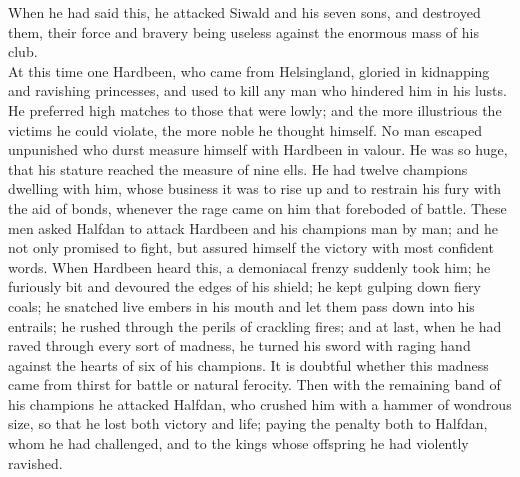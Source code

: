 \documentclass[10pt,a4paper]{report}
\begin{document}
When he had said this, he attacked Siwald and his seven sons, and destroyed them, their force and bravery being useless against the enormous mass of his club.\\

At this time one Hardbeen, who came from Helsingland, gloried in kidnapping and ravishing princesses, and used to kill any man who hindered him in his lusts. He preferred high matches to those that were lowly; and the more illustrious the victims he could violate, the more noble he thought himself. No man escaped unpunished who durst measure himself with Hardbeen in valour. He was so huge, that his stature reached the measure of nine ells. He had twelve champions dwelling with him, whose business it was to rise up and to restrain his fury with the aid of bonds, whenever the rage came on him that foreboded of battle. These men asked Halfdan to attack Hardbeen and his champions man by man; and he not only promised to fight, but assured himself the victory with most confident words. When Hardbeen heard this, a demoniacal frenzy suddenly took him; he furiously bit and devoured the edges of his shield; he kept gulping down fiery coals; he snatched live embers in his mouth and let them pass down into his entrails; he rushed through the perils of crackling fires; and at last, when he had raved through every sort of madness, he turned his sword with raging hand against the hearts of six of his champions. It is doubtful whether this madness came from thirst for battle or natural ferocity. Then with the remaining band of his champions he attacked Halfdan, who crushed him with a hammer of wondrous size, so that he lost both victory and life; paying the penalty both to Halfdan, whom he had challenged, and to the kings whose offspring he had violently ravished.\\
\end{document}
